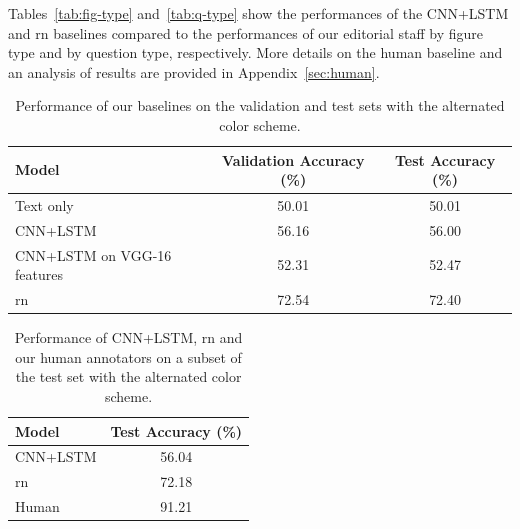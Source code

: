 \documentclass{article} %
\def\bestcnnvaltwo{56.16} %
\def\bestrnvaltwo{72.54} %
\def\bestvggvaltwo{52.31} %
\def\besttextvaltwo{50.01} %
\def\bestrntesttwo{72.40} %
\def\bestcnntesttwo{56.00} %
\def\bestvggtesttwo{52.47} %
\def\besttexttesttwo{50.01} %
\def\besthumantesttwohuman{91.21} %
\def\bestcnntesttwohuman{56.04} %
\def\bestrntesttwohuman{72.18} %
\begin{document}
Tables~\ref{tab:fig-type} and~\ref{tab:q-type} show the performances of the CNN+LSTM and \gls{rn} baselines compared to the performances of our editorial staff by figure type and by question type, respectively.
More details on the human baseline and an analysis of results are provided in Appendix~\ref{sec:human}.

\FloatBarrier
\begin{table}[h]
    \caption{Performance of our baselines on the validation and test sets with the alternated color scheme.}
    \label{tab:acc}
    \begin{center}
        \begin{tabular}{lcc}
            \toprule
            Model & Validation Accuracy  (\%) & Test Accuracy  (\%) \\
            \midrule
            Text only & \besttextvaltwo & \besttexttesttwo \\ %
            CNN+LSTM & \bestcnnvaltwo & \bestcnntesttwo \\ %
            CNN+LSTM on VGG-16 features & \bestvggvaltwo & \bestvggtesttwo \\ %
            \gls{rn} & \bestrnvaltwo & \bestrntesttwo \\ %
            \bottomrule
        \end{tabular}
    \end{center}
\end{table}

\begin{table}[h]
    \caption{Performance of CNN+LSTM, \gls{rn} and our human annotators on a subset of the test set with the alternated color scheme.}
    \label{tab:acc_on_subset}
    \begin{center}
        \begin{tabular}{lc}
            \toprule
            Model & Test Accuracy  (\%) \\
            \midrule
            CNN+LSTM & \bestcnntesttwohuman \\
            \gls{rn} & \bestrntesttwohuman \\ %
            Human & \besthumantesttwohuman \\
            \bottomrule
        \end{tabular}
    \end{center}
\end{table}
\end{document}
